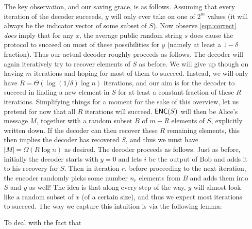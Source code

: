 The key observation, and our saving grace, is as follows. Assuming that every iteration of the decoder succeeds, $y$ will only ever take on one of $2^m$ values (it will always be the indicator vector of some subset of $S$). Now observe \eqref{eqn:correct} {\em does} imply that for any $x$, the average public random string $s$ does cause the protocol to succeed on most of these possibilities for $y$ (namely at least a $1-\delta$ fraction).
Thus our actual decoder roughly proceeds as follows. The decoder will again iteratively try to recover elements of $S$ as before. We will give up though on having $m$ iterations and hoping for most of them to succeed. Instead, we will only have $R = \Theta(\log(1/\delta)\log n)$ iterations, and our aim is for the decoder to succeed in finding a new element in $S$ for at least a constant fraction of these $R$ iterations. Simplifying things for a moment for the sake of this overview, let us pretend for now that all $R$ iterations will succeed. $\textsf{ENC}(S)$ will then be Alice's message $M$, together with a random subset $B$ of $m-R$ elements of $S$, explicitly written down. If the decoder can then recover these $R$ remaining elements, this then implies the decoder has recovered $S$, and thus we must have $|M| = \Omega(R\log n)$ as desired. The decoder proceeds as follows. Just as before, initially the decoder starts with $y = 0$ and lets $i$ be the output of Bob and adds it to his recovery for $S$. Then in iteration $r$, before proceeding to the next iteration, the encoder randomly picks some number $n_r$ elements from $B$ and adds them into $S$ and $y$ as well! The idea is that along every step of the way, $y$ will almost look like a random subset of $x$ (of a certain size), and thus we expect most iterations to succeed. The way we capture this intuition is via the following lemma:

To deal with the fact that 

